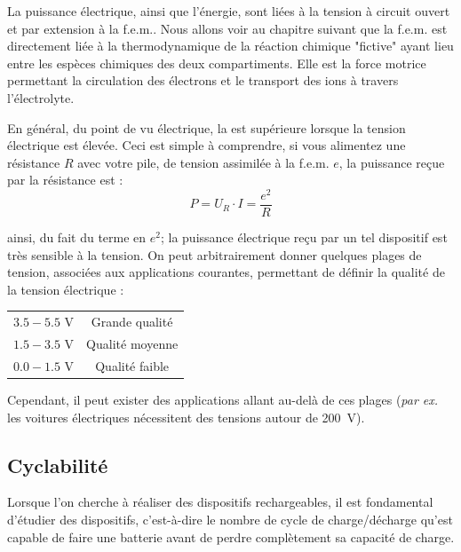 La puissance électrique, ainsi que l'énergie, sont liées à la tension à circuit ouvert et par extension à la f.e.m.. Nous allons voir au chapitre suivant que la f.e.m. est directement liée à la thermodynamique de la réaction chimique "fictive" ayant lieu entre les espèces chimiques des deux compartiments. Elle est la force motrice permettant la circulation des électrons et le transport des ions à travers l'électrolyte.

En général, du point de vu électrique, la  est supérieure lorsque la tension électrique est élevée. Ceci est simple à comprendre, si vous alimentez une résistance $R$ avec votre pile, de tension assimilée à la f.e.m. $e$, la puissance reçue par la résistance est : 
\begin{equation}
P = U_R \cdot I = \frac{e^2}{R}
\end{equation} 

ainsi, du fait du terme en $e^2$; la puissance électrique reçu par un tel dispositif est très sensible à la tension. On peut arbitrairement donner quelques plages de tension, associées aux applications courantes, permettant de définir la qualité de la tension électrique : 
\begin{center}

\begin{tabular}{cc}
$3.5 - 5.5$ \si{\volt} & Grande qualité \\
$1.5 - 3.5$ \si{\volt} & Qualité moyenne \\
$0.0 - 1.5$ \si{\volt} & Qualité faible
\end{tabular}
\end{center}

Cependant, il peut exister des applications allant au-delà de ces plages (\emph{par ex.} les voitures électriques nécessitent des tensions autour de \SI{200}{\volt}).

\subsection{Cyclabilité}
Lorsque l'on cherche à réaliser des dispositifs rechargeables, il est fondamental d'étudier  des dispositifs, c'est-à-dire le nombre de cycle de charge/décharge qu'est capable de faire une batterie avant de perdre complètement sa capacité de charge.


